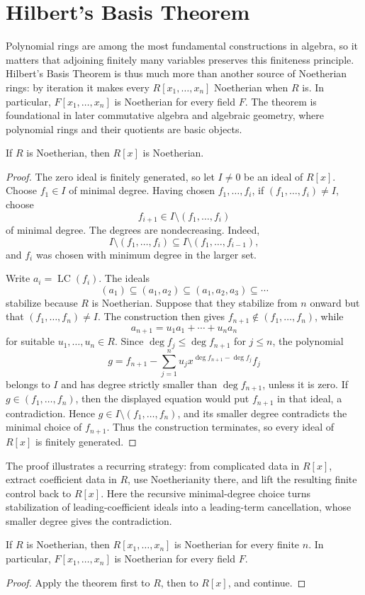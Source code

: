 \section{Hilbert's Basis Theorem}
Polynomial rings are among the most fundamental constructions in algebra, so
it matters that adjoining finitely many variables preserves this finiteness
principle.  Hilbert's Basis Theorem is thus much more than another source of
Noetherian rings: by iteration it makes every \(R[x_1,\ldots,x_n]\)
Noetherian when \(R\) is.  In particular, \(F[x_1,\ldots,x_n]\) is
Noetherian for every field \(F\).  The theorem is foundational in later
commutative algebra and algebraic geometry, where polynomial rings and their
quotients are basic objects.
\begin{theorem}
If \(R\) is Noetherian, then \(R[x]\) is Noetherian.
\end{theorem}
\begin{proof}
The zero ideal is finitely generated, so let \(I\ne0\) be an ideal of
\(R[x]\).  Choose \(f_1\in I\) of minimal
degree.  Having chosen \(f_1,\ldots,f_i\), if
\((f_1,\ldots,f_i)\ne I\), choose
\[
f_{i+1}\in I\setminus(f_1,\ldots,f_i)
\]
of minimal degree.  The degrees are nondecreasing.  Indeed,
\[
I\setminus(f_1,\ldots,f_i)
\subseteq I\setminus(f_1,\ldots,f_{i-1}),
\]
and \(f_i\) was chosen with minimum degree in the larger set.

Write \(a_i=\operatorname{LC}(f_i)\).  The ideals
\[
(a_1)\subseteq(a_1,a_2)\subseteq(a_1,a_2,a_3)\subseteq\cdots
\]
stabilize because \(R\) is Noetherian.  Suppose that they stabilize from
\(n\) onward but that \((f_1,\ldots,f_n)\ne I\).  The construction then
gives \(f_{n+1}\notin(f_1,\ldots,f_n)\), while
\[
a_{n+1}=u_1a_1+\cdots+u_na_n
\]
for suitable \(u_1,\ldots,u_n\in R\).  Since
\(\deg f_j\le\deg f_{n+1}\) for \(j\le n\), the polynomial
\[
g=f_{n+1}-\sum_{j=1}^n
u_jx^{\deg f_{n+1}-\deg f_j}f_j
\]
belongs to \(I\) and has degree strictly smaller than \(\deg f_{n+1}\),
unless it is zero.  If \(g\in(f_1,\ldots,f_n)\), then the displayed equation
would put \(f_{n+1}\) in that ideal, a contradiction.  Hence
\(g\in I\setminus(f_1,\ldots,f_n)\), and its smaller degree contradicts the
minimal choice of \(f_{n+1}\).  Thus the construction terminates, so every
ideal of \(R[x]\) is finitely generated.
\end{proof}
The proof illustrates a recurring strategy: from complicated data in
\(R[x]\), extract coefficient data in \(R\), use Noetherianity there, and
lift the resulting finite control back to \(R[x]\).  Here the recursive
minimal-degree choice turns stabilization of leading-coefficient ideals into
a leading-term cancellation, whose smaller degree gives the contradiction.
\begin{corollary}
If \(R\) is Noetherian, then \(R[x_1,\ldots,x_n]\) is Noetherian for every
finite \(n\).  In particular, \(F[x_1,\ldots,x_n]\) is Noetherian for every
field \(F\).
\end{corollary}
\begin{proof}
Apply the theorem first to \(R\), then to \(R[x]\), and continue.
\end{proof}

